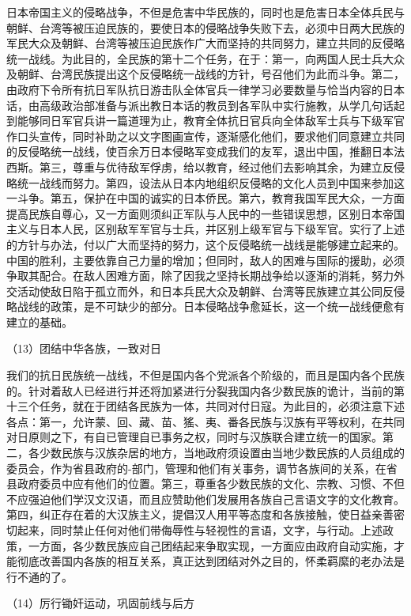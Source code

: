 \documentclass[UTF8, 12pt, a4paper]{ctexrep}
\begin{document}
日本帝国主义的侵略战争，不但是危害中华民族的，同时也是危害日本全体兵民与朝鲜、台湾等被压迫民族的，要使日本的侵略战争失败下去，必须中日两大民族的军民大众及朝鲜、台湾等被压迫民族作广大而坚持的共同努力，建立共同的反侵略统一战线。为此目的，全民族的第十二个任务，在于：第一，向两国人民士兵大众及朝鲜、台湾民族提出这个反侵略统一战线的方针，号召他们为此而斗争。第二，由政府下令所有抗日军队抗日游击队全体官兵一律学习必要数量与恰当内容的日本话，由高级政治部准备与派出教日本话的教员到各军队中实行施教，从学几句话起到能够同日军官兵讲一篇道理为止，教育全体抗日官兵向全体敌军士兵与下级军官作口头宣传，同时补助之以文字图画宣传，逐渐感化他们，要求他们同意建立共同的反侵略统一战线，使百余万日本侵略军变成我们的友军，退出中国，推翻日本法西斯。第三，尊重与优待敌军俘虏，给以教育，经过他们去影响其余，为建立反侵略统一战线而努力。第四，设法从日本内地组织反侵略的文化人员到中国来参加这一斗争。第五，保护在中国的诚实的日本侨民。第六，教育我国军民大众，一方面提高民族自尊心，又一方面则须纠正军队与人民中的一些错误思想，区别日本帝国主义与日本人民，区别敌军军官与士兵，并区别上级军官与下级军官。实行了上述的方针与办法，付以广大而坚持的努力，这个反侵略统一战线是能够建立起来的。中国的胜利，主要依靠自己力量的增加；但同时，敌人的困难与国际的援助，必须争取其配合。在敌人困难方面，除了因我之坚持长期战争给以逐渐的消耗，努力外交活动使敌日陷于孤立而外，和日本兵民大众及朝鲜、台湾等民族建立其公同反侵略战线的政策，是不可缺少的部分。日本侵略战争愈延长，这一个统一战线便愈有建立的基础。

（13）团结中华各族，一致对日

我们的抗日民族统一战线，不但是国内各个党派各个阶级的，而且是国内各个民族的。针对着敌人已经进行并还将加紧进行分裂我国内各少数民族的诡计，当前的第十三个任务，就在于团结各民族为一体，共同对付日寇。为此目的，必须注意下述各点：第一，允许蒙、回、藏、苗、猺、夷、番各民族与汉族有平等权利，在共同对日原则之下，有自已管理自已事务之权，同时与汉族联合建立统一的国家。第二，各少数民族与汉族杂居的地方，当地政府须设置由当地少数民族的人员组成的委员会，作为省县政府的-部门，管理和他们有关事务，调节各族间的关系，在省县政府委员中应有他们的位置。第三，尊重各少数民族的文化、宗教、习惯、不但不应强迫他们学汉文汉语，而且应赞助他们发展用各族自己言语文字的文化教育。第四，纠正存在着的大汉族主义，提倡汉人用平等态度和各族接触，使日益亲善密切起来，同时禁止任何对他们带侮辱性与轻视性的言语，文字，与行动。上述政策，一方面，各少数民族应自己团结起来争取实现，一方面应由政府自动实施，才能彻底改善国内各族的相互关系，真正达到团结对外之目的，怀柔羁縻的老办法是行不通的了。

（14）厉行锄奸运动，巩固前线与后方
\end{document}

